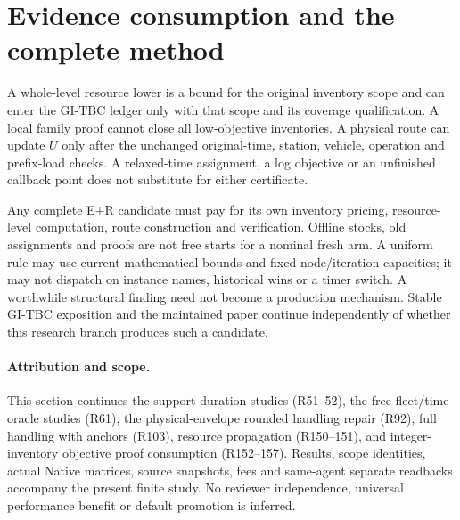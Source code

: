 \documentclass[11pt]{article}
\begin{document}


\section{Evidence consumption and the complete method}
A whole-level resource lower is a bound for the original inventory scope
and can enter the GI-TBC ledger only with that scope and its coverage
qualification. A local family proof cannot close all low-objective
inventories. A physical route can update $U$ only after the unchanged
original-time, station, vehicle, operation and prefix-load checks. A
relaxed-time assignment, a log objective or an unfinished callback point
does not substitute for either certificate.

Any complete E+R candidate must pay for its own inventory pricing,
resource-level computation, route construction and verification. Offline
stocks, old assignments and proofs are not free starts for a nominal
fresh arm. A uniform rule may use current mathematical bounds and fixed
node/iteration capacities; it may not dispatch on instance names,
historical wins or a timer switch. A worthwhile structural finding need
not become a production mechanism. Stable GI-TBC exposition and the
maintained paper continue independently of whether this research branch
produces such a candidate.

\paragraph{Attribution and scope.}
This section continues the support-duration studies (R51--52), the
free-fleet/time-oracle studies (R61), the
physical-envelope rounded handling repair (R92), full handling with
anchors (R103), resource propagation (R150--151), and integer-inventory
objective proof consumption (R152--157). Results, scope identities,
actual Native matrices, source snapshots, fees and same-agent separate
readbacks accompany the present finite study. No reviewer independence,
universal performance benefit or default promotion is inferred.
\end{document}
